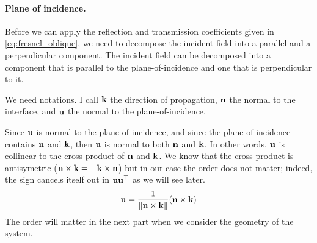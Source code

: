 \paragraph{Plane of incidence.}
Before we can apply the reflection and transmission coefficients given in \cref{eq:fresnel_oblique}, we need to decompose the incident field into a parallel and a perpendicular component.
The incident field can be decomposed into a component that is parallel to the plane-of-incidence and one that is perpendicular to it.

We need notations.
I call $\mathbf{k}$ the direction of propagation, $\mathbf{n}$ the normal to the interface, and $\mathbf{u}$ the normal to the plane-of-incidence.

Since $\mathbf{u}$ is normal to the plane-of-incidence, and since the plane-of-incidence contains $\mathbf{n}$ and $\mathbf{k}$, then $\mathbf{u}$ is normal to both $\mathbf{n}$ and $\mathbf{k}$.
In other words, $\mathbf{u}$ is collinear to the cross product of $\mathbf{n}$ and $\mathbf{k}$.
We know that the cross-product is antisymetric
($\mathbf{n} \times \mathbf{k} = \mathord{-} \mathbf{k} \times \mathbf{n}$)
but in our case the order does not matter;
indeed, the sign cancels itself out in $\mathbf{u} \mathbf{u}^\top$ as we will see later.
\begin{equation}
    \mathbf{u} = \frac{1}{\left\| \mathbf{n} \times \mathbf{k} \right\|} (\mathbf{n} \times \mathbf{k})  \label{eq:normal_to_plane_of_incidence}
\end{equation}
The order will matter in the next part when we consider the geometry of the system. 

